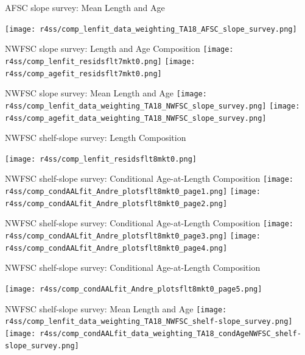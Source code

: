 \documentclass[pdf]{beamer}\usepackage[]{graphicx}\usepackage[]{color}
\begin{document}
\begin{frame}{AFSC slope survey: Mean Length and Age}
  \begin{center}
  \texttt{[image: r4ss/comp\_lenfit\_data\_weighting\_TA18\_AFSC\_slope\_survey.png]}
  \end{center}
\end{frame}

\begin{frame}{NWFSC slope survey: Length and Age Composition}
  \texttt{[image: r4ss/comp\_lenfit\_residsflt7mkt0.png]}
  \texttt{[image: r4ss/comp\_agefit\_residsflt7mkt0.png]}
\end{frame}

\begin{frame}{NWFSC slope survey: Mean Length and Age}
  \texttt{[image: r4ss/comp\_lenfit\_data\_weighting\_TA18\_NWFSC\_slope\_survey.png]}
  \texttt{[image: r4ss/comp\_agefit\_data\_weighting\_TA18\_NWFSC\_slope\_survey.png]}
\end{frame}

\begin{frame}{NWFSC shelf-slope survey: Length Composition}
  \begin{center}
  \texttt{[image: r4ss/comp\_lenfit\_residsflt8mkt0.png]}
  \end{center}
\end{frame}

\begin{frame}{NWFSC shelf-slope survey: Conditional Age-at-Length Composition}
  \texttt{[image: r4ss/comp\_condAALfit\_Andre\_plotsflt8mkt0\_page1.png]}
  \texttt{[image: r4ss/comp\_condAALfit\_Andre\_plotsflt8mkt0\_page2.png]}
\end{frame}

\begin{frame}{NWFSC shelf-slope survey: Conditional Age-at-Length Composition}
  \texttt{[image: r4ss/comp\_condAALfit\_Andre\_plotsflt8mkt0\_page3.png]}
  \texttt{[image: r4ss/comp\_condAALfit\_Andre\_plotsflt8mkt0\_page4.png]}
\end{frame}

\begin{frame}{NWFSC shelf-slope survey: Conditional Age-at-Length Composition}
  \begin{center}
  \texttt{[image: r4ss/comp\_condAALfit\_Andre\_plotsflt8mkt0\_page5.png]}
  \end{center}
\end{frame}

\begin{frame}{NWFSC shelf-slope survey: Mean Length and Age}
  \texttt{[image: r4ss/comp\_lenfit\_data\_weighting\_TA18\_NWFSC\_shelf-slope\_survey.png]}
  \texttt{[image: r4ss/comp\_condAALfit\_data\_weighting\_TA18\_condAgeNWFSC\_shelf-slope\_survey.png]}
\end{frame}
\end{document}

